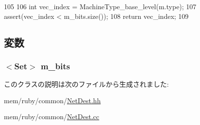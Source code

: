 \begin{DoxyCode}
105     {
106         int vec_index = MachineType_base_level(m.type);
107         assert(vec_index < m_bits.size());
108         return vec_index;
109     }
\end{DoxyCode}


\subsection{変数}
\hypertarget{classNetDest_ac0959126d3ef138cfbd0499eaca44f23}{
\subsubsection[{m\_\-bits}]{$<${\bf Set}$>$ {\bf m\_\-bits}}}
\label{classNetDest_ac0959126d3ef138cfbd0499eaca44f23}


このクラスの説明は次のファイルから生成されました:\begin{DoxyCompactItemize}
\item 
mem/ruby/common/\hyperlink{NetDest_8hh}{NetDest.hh}\item 
mem/ruby/common/\hyperlink{NetDest_8cc}{NetDest.cc}\end{DoxyCompactItemize}
